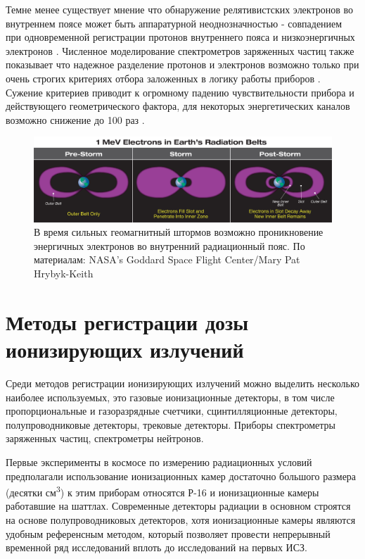 Темне менее существует мнение что обнаружение релятивистских  электронов во внутреннем поясе может быть аппаратурной неоднозначностью - совпадением при одновременной регистрации  протонов внутреннего пояса и низкоэнергичных электронов \cite{Selesnick2015}. Численное моделирование спектрометров заряженных частиц также показывает что надежное разделение протонов и электронов возможно только при очень строгих критериях отбора заложенных в логику работы приборов \cite{zolotarev2017numerical51590279}. Сужение критериев  приводит к огромному падению чувствительности прибора и действующего геометрического фактора, для некоторых энергетических каналов возможно снижение до 100 раз \cite{zolotarev2017numerical51590279}.
 
\begin{figure}
	\centering
	\includegraphics[width=0.7\linewidth]{images/inner_electron_belt_illustration}
	\caption{ В время сильных геомагнитный штормов возможно проникновение энергичных электронов во внутренний радиационный пояс. По материалам: NASA’s Goddard Space Flight Center/Mary Pat Hrybyk-Keith \cite{Johnson-Groh2017}}
	\label{fig:innerelectronbeltillustration}
\end{figure}

\section{Методы регистрации дозы ионизирующих излучений} \label{sect1_2}

Среди методов регистрации ионизирующих излучений можно выделить несколько наиболее используемых, это газовые ионизационные детекторы, в том числе пропорциональные и газоразрядные счетчики, сцинтилляционные детекторы, полупроводниковые детекторы, трековые детекторы. Приборы спектрометры заряженных частиц, спектрометры нейтронов.

Первые эксперименты в космосе по измерению радиационных условий предполагали использование ионизационных камер достаточно большого размера (десятки см\textsuperscript{3}) к этим приборам относятся Р-16 и ионизационные камеры работавшие на шаттлах\cite{Dorman2004}. Современные детекторы радиации в основном строятся на основе полупроводниковых детекторов, хотя ионизационные камеры являются удобным референсным методом, который позволяет провести непрерывный временной ряд исследований вплоть до исследований на первых ИСЗ.

